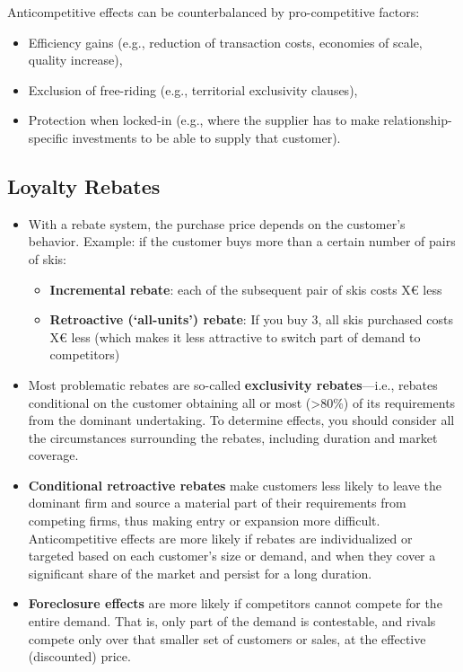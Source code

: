             Anticompetitive effects can be counterbalanced by pro-competitive factors:
            
            \begin{itemize}
                \item Efficiency gains (e.g., reduction of transaction costs, economies of scale, quality increase),
                \item Exclusion of free-riding (e.g., territorial exclusivity clauses),
                \item Protection when locked-in (e.g., where the supplier has to make relationship-specific investments to be able to supply that customer).
            \end{itemize}

    \subsection{Loyalty Rebates}

        \begin{itemize}
            \item With a rebate system, the purchase price depends on the customer’s behavior. Example: if the customer buys more than a certain number of pairs of skis:
                \begin{itemize}
                    \item \textbf{Incremental rebate}: each of the subsequent pair of skis costs X€ less
                    \item \textbf{Retroactive (‘all-units’) rebate}: If you buy 3, all skis purchased costs X€ less (which makes it less attractive to switch part of demand to competitors)
                \end{itemize}
            \item Most problematic rebates are so-called \textbf{exclusivity rebates}—i.e., rebates conditional on the customer obtaining all or most (>80\%) of its requirements from the dominant undertaking. To determine effects, you should consider all the circumstances surrounding the rebates, including duration and market coverage.
            \item \textbf{Conditional retroactive rebates} make customers less likely to leave the dominant firm and source a material part of their requirements from competing firms, thus making entry or expansion more difficult. Anticompetitive effects are more likely if rebates are individualized or targeted based on each customer’s size or demand, and when they cover a significant share of the market and persist for a long duration.
            \item \textbf{Foreclosure effects} are more likely if competitors cannot compete for the entire demand. That is, only part of the demand is contestable, and rivals compete only over that smaller set of customers or sales, at the effective (discounted) price.
        \end{itemize}

